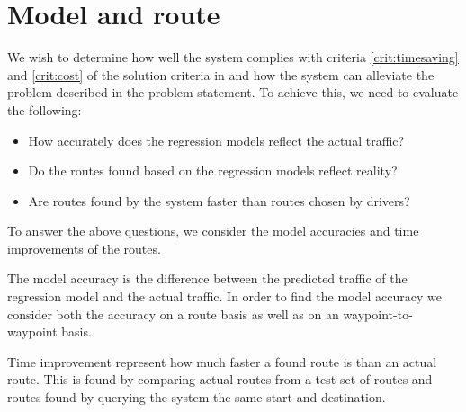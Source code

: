 \section{Model and route}
We wish to determine how well the system complies with criteria \ref{crit:timesaving} and \ref{crit:cost} of the solution criteria in  and how the system can alleviate the problem described in the problem statement. To achieve this, we need to evaluate the following:
\begin{itemize}
\item How accurately does the regression models reflect the actual traffic?
\item Do the routes found based on the regression models reflect reality?
\item Are routes found by the system faster than routes chosen by drivers?
\end{itemize}
To answer the above questions, we consider the model accuracies and time improvements of the routes. 

The model accuracy is the difference between the predicted traffic of the regression model and the actual traffic. In order to find the model accuracy we consider both the accuracy on a route basis as well as on an waypoint-to-waypoint basis.

Time improvement represent how much faster a found route is than an actual route. This is found by comparing actual routes from a test set of routes and routes found by querying the system the same start and destination.

